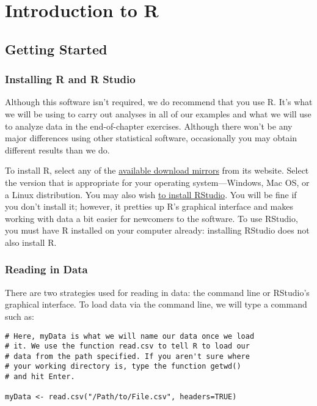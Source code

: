 
\chapter[Introduction to R]{Introduction to R}

\section{Getting Started}

\subsection{Installing R and R Studio}
Although this software isn't required, we do recommend that you use R. It's what we will be using to carry out analyses in all of our examples and what we will use to analyze data in the end-of-chapter exercises. Although there won't be any major differences using other statistical software, occasionally you may obtain different results than we do.

To install R, select any of the \href{http://cran.r-project.org/mirrors.html}{available download mirrors} from its website. Select the version that is appropriate for your operating system---Windows, Mac OS, or a Linux distribution. You may also wish \href{http://www.rstudio.com/}{to install RStudio}. You will be fine if you don't install it; however, it pretties up R's graphical interface and makes working with data a bit easier for newcomers to the software. To use RStudio, you must have R installed on your computer already: installing RStudio does not also install R.

\subsection{Reading in Data}
There are two strategies used for reading in data: the command line or RStudio's graphical interface. To load data via the command line, we will type a command such as:

\begin{framed}
\begin{Verbatim}[samepage=TRUE]
# Here, myData is what we will name our data once we load
# it. We use the function read.csv to tell R to load our
# data from the path specified. If you aren't sure where
# your working directory is, type the function getwd()
# and hit Enter.
 
myData <- read.csv("/Path/to/File.csv", headers=TRUE)
\end{Verbatim}
\end{framed}


